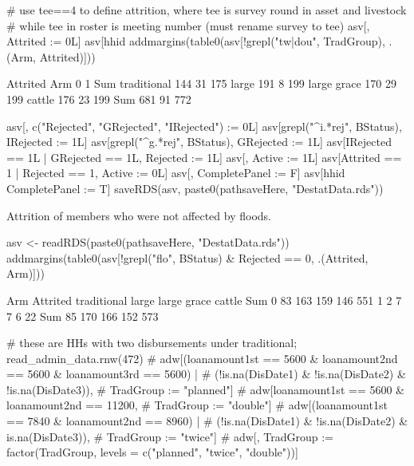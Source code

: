 \begin{Schunk}
\begin{Sinput}
# use tee==4 to define attrition, where tee is survey round in asset and livestock 
# while tee in roster is meeting number (must rename survey to tee)
asv[, Attrited := 0L]
asv[hhid %in% hhid[AttritIn < 9], Attrited := 1L]
addmargins(table0(asv[!grepl("tw|dou", TradGroup), .(Arm, Attrited)]))
\end{Sinput}
\begin{Soutput}
             Attrited
Arm             0   1 Sum
  traditional 144  31 175
  large       191   8 199
  large grace 170  29 199
  cattle      176  23 199
  Sum         681  91 772
\end{Soutput}
\begin{Sinput}
asv[, c("Rejected", "GRejected", "IRejected") := 0L]
asv[grepl("^i.*rej", BStatus), IRejected := 1L]
asv[grepl("^g.*rej", BStatus), GRejected := 1L]
asv[IRejected == 1L | GRejected == 1L, Rejected := 1L]
asv[, Active := 1L]
asv[Attrited == 1 | Rejected == 1, Active := 0L]
asv[, CompletePanel := F]
asv[hhid %in% intersect(hhid[tee == 1 & !is.na(NetValue)], hhid[tee == 4 & !is.na(NetValue)]),
  CompletePanel := T]
saveRDS(asv, paste0(pathsaveHere, "DestatData.rds"))
\end{Sinput}
\end{Schunk}
Attrition of members who were not affected by floods.
\begin{Schunk}
\begin{Sinput}
asv <- readRDS(paste0(pathsaveHere, "DestatData.rds"))
addmargins(table0(asv[!grepl("flo", BStatus) & Rejected == 0, .(Attrited, Arm)]))
\end{Sinput}
\begin{Soutput}
        Arm
Attrited traditional large large grace cattle Sum
     0            83   163         159    146 551
     1             2     7           7      6  22
     Sum          85   170         166    152 573
\end{Soutput}
\begin{Sinput}
# these are HHs with two disbursements under traditional; read_admin_data.rnw(472)
# adw[(loanamount1st == 5600 & loanamount2nd == 5600 & loanamount3rd == 5600) |
#   (!is.na(DisDate1) & !is.na(DisDate2) & !is.na(DisDate3)), 
#   TradGroup := "planned"]
# adw[loanamount1st == 5600 & loanamount2nd == 11200, 
#   TradGroup := "double"]
# adw[(loanamount1st == 7840 & loanamount2nd == 8960) | 
#   (!is.na(DisDate1) & !is.na(DisDate2) & is.na(DisDate3)), 
#   TradGroup := "twice"]
# adw[, TradGroup := factor(TradGroup, levels = c("planned", "twice", "double"))]
\end{Sinput}
\end{Schunk}
